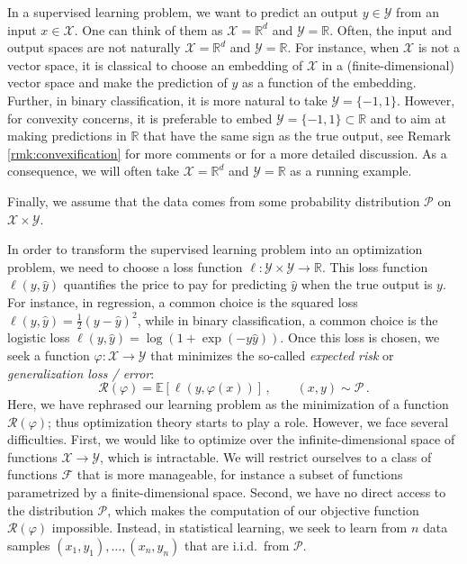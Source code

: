 \documentclass[11pt,reqno]{article}
\newcommand{\E}{\mathbb{E}}
\newcommand{\R}{\mathbb{R}}
\newcommand{\cP}{\mathcal{P}}
\newcommand{\cF}{\mathcal{F}}
\newcommand{\cX}{\mathcal{X}}
\newcommand{\cY}{\mathcal{Y}}
\newcommand{\cR}{\mathcal{R}}
\numberwithin{equation}{section}
\theoremstyle{plain}
\theoremstyle{definition}
\theoremstyle{remark}
\begin{document}
In a supervised learning problem, we want to predict an output $y \in \cY$ from an input $x \in \cX$. One can think of them as $\cX = \R^d$ and $\cY = \R$. Often, the input and output spaces are not naturally $\cX = \R^d$ and $\cY = \R$. For instance, when $\cX$ is not a vector space, it is classical to choose an embedding of $\cX$ in a (finite-dimensional) vector space and make the prediction of $y$ as a function of the embedding. Further, in binary classification, it is more natural to take $\cY = \{-1,1\}$. However, for convexity concerns, it is preferable to embed $\cY = \{-1,1\} \subset \R$ and to aim at making predictions in $\R$ that have the same sign as the true output, see Remark \ref{rmk:convexification} for more comments or \cite[Section 4]{bach2024learning} for a more detailed discussion. As a consequence, we will often take $\cX = \R^d$ and $\cY = \R$ as a running example. 

Finally, we assume that the data comes from some probability distribution $\cP$ on $\cX \times \cY$.

In order to transform the supervised learning problem into an optimization problem, we need to choose a loss function $\ell:\cY\times\cY \to \R$. This loss function $\ell(y,\widehat{y})$ quantifies the price to pay for predicting $\widehat{y}$ when the true output is $y$. For instance, in regression, a common choice is the squared loss $\ell(y,\widehat{y}) = \frac{1}{2}(y-\widehat{y})^2$, while in binary classification, a common choice is the logistic loss $\ell(y,\widehat{y}) = \log(1+\exp(-y\widehat{y}))$. Once this loss is chosen, we seek a function $\varphi:\cX \to \cY$ that minimizes the so-called \emph{expected risk} or \emph{generalization loss / error}:
\begin{equation*}
	\cR(\varphi) = \E[\ell(y,\varphi(x))] \, , \qquad (x,y) \sim \cP \, .
\end{equation*}	
Here, we have rephrased our learning problem as the minimization of a function~$\cR(\varphi)$; thus optimization theory starts to play a role. However, we face several difficulties. First, we would like to optimize over the infinite-dimensional space of functions $\cX \to \cY$, which is intractable. We will restrict ourselves to a class of functions $\cF$ that is more manageable, for instance a subset of functions parametrized by a finite-dimensional space. Second, we have no direct access to the distribution $\cP$, which makes the computation of our objective function $\cR(\varphi)$ impossible. Instead, in statistical learning, we seek to learn from $n$ data samples $(x_1, y_1), \dots, (x_n, y_n)$ that are i.i.d.~from $\cP$. 
\end{document}
